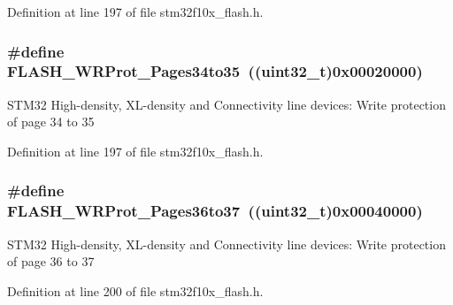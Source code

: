Definition at line 197 of file stm32f10x\+\_\+flash.\+h.

\subsubsection[{\texorpdfstring{F\+L\+A\+S\+H\+\_\+\+W\+R\+Prot\+\_\+\+Pages34to35}{FLASH_WRProt_Pages34to35}}]{\setlength{\rightskip}{0pt plus 5cm}\#define F\+L\+A\+S\+H\+\_\+\+W\+R\+Prot\+\_\+\+Pages34to35~(({\bf uint32\+\_\+t})0x00020000)}\hypertarget{group___option___bytes___write___protection_gaa5fee32ae0631b81413414f8e716868b}{}\label{group___option___bytes___write___protection_gaa5fee32ae0631b81413414f8e716868b}
S\+T\+M32 High-\/density, X\+L-\/density and Connectivity line devices\+: Write protection of page 34 to 35 

Definition at line 197 of file stm32f10x\+\_\+flash.\+h.

\subsubsection[{\texorpdfstring{F\+L\+A\+S\+H\+\_\+\+W\+R\+Prot\+\_\+\+Pages36to37}{FLASH_WRProt_Pages36to37}}]{\setlength{\rightskip}{0pt plus 5cm}\#define F\+L\+A\+S\+H\+\_\+\+W\+R\+Prot\+\_\+\+Pages36to37~(({\bf uint32\+\_\+t})0x00040000)}\hypertarget{group___option___bytes___write___protection_gab00dc29c0f12afd25cdb21b6d187ccc9}{}\label{group___option___bytes___write___protection_gab00dc29c0f12afd25cdb21b6d187ccc9}
S\+T\+M32 High-\/density, X\+L-\/density and Connectivity line devices\+: Write protection of page 36 to 37 

Definition at line 200 of file stm32f10x\+\_\+flash.\+h.

